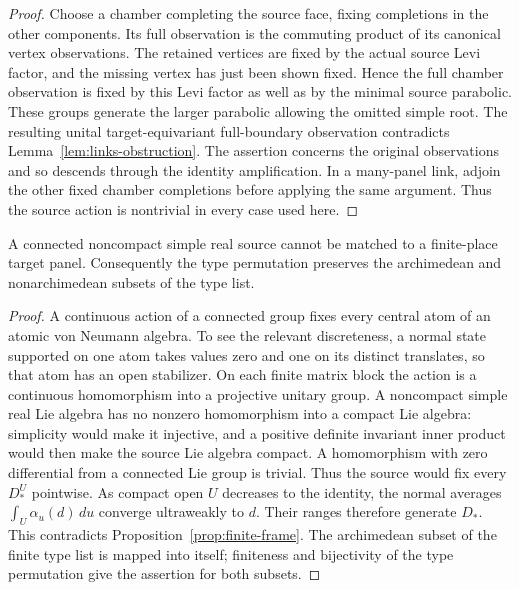 \begin{proof}
Choose a chamber completing the source face, fixing completions in
the other components.  Its full observation is the commuting product
of its canonical vertex observations.  The retained vertices are
fixed by the actual source Levi factor, and the missing vertex has
just been shown fixed.  Hence the full chamber observation is fixed
by this Levi factor as well as by the minimal source parabolic.
These groups generate the larger parabolic allowing the omitted
simple root.  The resulting unital target-equivariant full-boundary
observation contradicts Lemma~\ref{lem:links-obstruction}.
The assertion concerns the original
observations and so descends through the identity amplification.
In a many-panel link, adjoin the other fixed chamber completions
before applying the same argument.  Thus the source action is
nontrivial in every case used here.
\end{proof}

\begin{corollary}
\label{cor:finite-arch-separation}
A connected noncompact simple real source cannot be matched to a
finite-place target panel.  Consequently the type permutation preserves
the archimedean and nonarchimedean subsets of the type list.
\end{corollary}

\begin{proof}
A continuous action of a connected group fixes every central atom of
an atomic von Neumann algebra.  To see the relevant discreteness,
a normal state supported on one atom takes values zero and one on
its distinct translates, so that atom has an open stabilizer.
On each finite matrix block the action is a continuous homomorphism
into a projective unitary group.  A noncompact simple real Lie algebra
has no nonzero homomorphism into a compact Lie algebra: simplicity
would make it injective, and a positive definite invariant inner
product would then make the source Lie algebra compact.  A
homomorphism with zero differential from a connected Lie group is
trivial.  Thus the source would fix every $D_*^U$ pointwise.
As compact open $U$ decreases to the identity, the normal averages
$\int_U\alpha_u(d)\,du$ converge ultraweakly to $d$.  Their ranges
therefore generate $D_*$.  This contradicts
Proposition~\ref{prop:finite-frame}.
The archimedean subset of the finite type list is mapped into itself;
finiteness and bijectivity of the type permutation give the assertion
for both subsets.
\end{proof}

